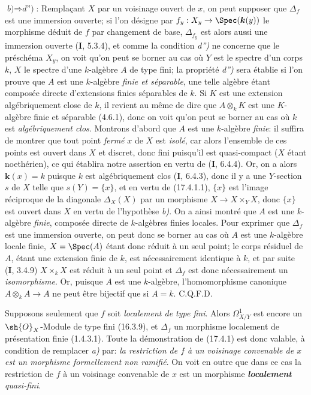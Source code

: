 $\textit{b)}\Rightarrow\textit{d'')}$: Remplaçant $X$ par un voisinage ouvert de $x$, on peut supposer que $\Delta_f$ est une immersion ouverte; si l'on désigne par $f_y:X_y\to\Spec(\boldsymbol{k}(y))$ le morphisme déduit de $f$ par changement de base, $\Delta_{f_y}$ est alors aussi une immersion ouverte (\textbf{I}, 5.3.4), et comme la condition \emph{d'')} ne concerne que le préschéma $X_y$, on voit qu'on peut se borner au cas où $Y$ est le spectre d'un corps $k$, $X$ le spectre d'une $k$-algèbre $A$ de type fini; la propriété \emph{d'')} sera établie si l'on prouve que $A$ est une $k$-algèbre \emph{finie et séparable}, une telle algèbre étant composée directe d'extensions finies séparables de $k$. Si $K$ est une extension algébriquement close de $k$, il revient au même de dire que $A\otimes_k K$ est une $K$-algèbre finie et séparable (4.6.1), donc on voit qu'on peut se borner au cas où $k$ est \emph{algébriquement clos}. Montrons d'abord que $A$ est une $k$-algèbre \emph{finie}: il suffira de montrer que tout point \emph{fermé} $x$ de $X$ est \emph{isolé}, car alors l'ensemble de ces points est ouvert dans $X$ et discret, donc fini puisqu'il est quasi-compact ($X$ étant noethérien), ce qui établira notre assertion en vertu de (\textbf{I}, 6.4.4). Or, on a alors $\boldsymbol{k}(x)=k$ puisque $k$ est algébriquement clos (\textbf{I}, 6.4.3), donc il y a une $Y$-section $s$ de $X$ telle que $s(Y)=\{x\}$, et en vertu de (17.4.1.1), $\{x\}$ est l'image réciproque de la diagonale $\Delta_X(X)$ par un morphisme $X\to X\times_Y X$, donc $\{x\}$ est ouvert dans $X$ en vertu de l'hypothèse \emph{b)}. On a ainsi montré que $A$ est une
$k$-algèbre \emph{finie}, composée directe de $k$-algèbres finies locales. Pour exprimer que $\Delta_f$ est une immersion ouverte, on peut donc se borner au cas où $A$ est une $k$-algèbre locale finie, $X=\Spec(A)$ étant donc réduit à un seul point; le corps résiduel de $A$, étant une extension finie de $k$, est nécessairement identique à $k$, et par suite (\textbf{I}, 3.4.9) $X\times_k X$ est réduit à un seul point et $\Delta_f$ est donc nécessairement un \emph{isomorphisme}. Or, puisque $A$ est une $k$-algèbre, l'homomorphisme canonique $A\otimes_k A\to A$ ne peut être bijectif que si $A=k$. C.Q.F.D.

\begin{remark}[17.4.1.2]
\label{IV.17.4.1.2}
Supposons seulement que $f$ soit \emph{localement de type fini}. Alors $\varOmega^1_{X/Y}$ est encore un $\sh{O}_X$-Module de type fini (16.3.9), et $\Delta_f$ un morphisme localement de présentation finie (1.4.3.1). Toute la démonstration de (17.4.1) est donc valable, à condition de remplacer \emph{a)} par: \emph{la restriction de $f$ à un voisinage convenable de $x$ est un morphisme formellement non ramifié}. On voit en outre que dans ce cas la restriction de $f$ à un voisinage convenable de $x$ est un morphisme \emph{\textbf{localement} quasi-fini}.
\end{remark}


